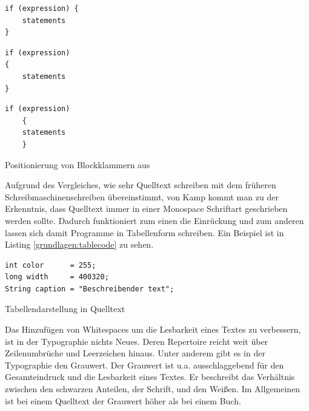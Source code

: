 \begin{listing}[H]
        \begin{minipage}{0.35\textwidth}
            \centering
	    \begin{verbatim}
if (expression) {
    statements
}
	    \end{verbatim}
        \end{minipage}
        \begin{minipage}{0.3\textwidth}
            \centering
	    \begin{verbatim}
if (expression)
{
    statements
}
	    \end{verbatim}
        \end{minipage}
        \begin{minipage}{0.3\textwidth}
            \centering
	    \begin{verbatim}
if (expression)
	{
    statements
	}
	    \end{verbatim}
        \end{minipage}
    \caption{Positionierung von Blockklammern aus \cite[S. 8]{Green}}
    \label{grundlagen:blockklammern}
\end{listing}

Aufgrund des Vergleiches, wie sehr Quelltext schreiben mit dem früheren Schreibmaschinenschreiben übereinstimmt, von Kamp\cite{Kamp} kommt man zu der Erkenntnis, dass Quelltext immer in einer Monospace Schriftart geschrieben werden sollte\cite[S. 2]{Green}. Dadurch funktioniert zum einen die Einrückung und zum anderen lassen sich damit Programme in Tabellenform schreiben. Ein Beispiel ist in Listing \ref{grundlagen:tablecode} zu sehen.

\begin{listing}[H]
    \begin{verbatim}
int color      = 255;
long width     = 400320;
String caption = "Beschreibender text";
    \end{verbatim}
    \caption{Tabellendarstellung in Quelltext}
    \label{grundlagen:tablecode}
\end{listing}

Das Hinzufügen von Whitespaces um die Lesbarkeit eines Textes zu verbessern, ist in der Typographie nichts Neues. Deren Repertoire reicht weit über Zeilenumbrüche und Leerzeichen hinaus. Unter anderem gibt es in der Typographie den Grauwert. Der Grauwert ist u.a. ausschlaggebend für den Gesamteindruck und die Lesbarkeit
eines Textes. Er beschreibt das Verhältnis zwischen den schwarzen Anteilen, der Schrift, und den Weißen. Im Allgemeinen ist bei einem Quelltext der Grauwert höher als bei einem Buch.  \cite{Beinert}


